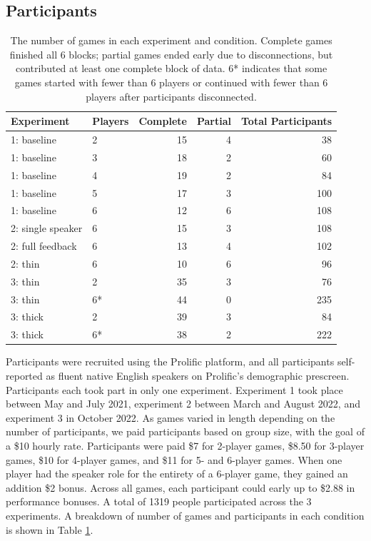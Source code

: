 \documentclass[
  english,
  a4paper,
]{article}
\begin{document}
\hypertarget{participants}{%
\subsection{Participants}\label{participants}}

\begin{table}

\caption{\label{tab:participants}The number of games in each experiment and condition. Complete games finished all 6 blocks; partial games ended early due to disconnections, but contributed at least one complete block of data. 6* indicates that some games started with fewer than 6 players or continued with fewer than 6 players after participants disconnected.}
\centering
\begin{tabular}[t]{l|l|r|r|r}
\hline
Experiment & Players & Complete & Partial & Total Participants\\
\hline
1: baseline & 2 & 15 & 4 & 38\\
\hline
1: baseline & 3 & 18 & 2 & 60\\
\hline
1: baseline & 4 & 19 & 2 & 84\\
\hline
1: baseline & 5 & 17 & 3 & 100\\
\hline
1: baseline & 6 & 12 & 6 & 108\\
\hline
2: single speaker & 6 & 15 & 3 & 108\\
\hline
2: full feedback & 6 & 13 & 4 & 102\\
\hline
2: thin & 6 & 10 & 6 & 96\\
\hline
3: thin & 2 & 35 & 3 & 76\\
\hline
3: thin & 6* & 44 & 0 & 235\\
\hline
3: thick & 2 & 39 & 3 & 84\\
\hline
3: thick & 6* & 38 & 2 & 222\\
\hline
\end{tabular}
\end{table}

Participants were recruited using the Prolific platform, and all participants self-reported as fluent native English speakers on Prolific's demographic prescreen. Participants each took part in only one experiment. Experiment 1 took place between May and July 2021, experiment 2 between March and August 2022, and experiment 3 in October 2022. As games varied in length depending on the number of participants, we paid participants based on group size, with the goal of a \$10 hourly rate. Participants were paid \$7 for 2-player games, \$8.50 for 3-player games, \$10 for 4-player games, and \$11 for 5- and 6-player games. When one player had the speaker role for the entirety of a 6-player game, they gained an addition \$2 bonus. Across all games, each participant could early up to \$2.88 in performance bonuses. A total of 1319 people participated across the 3 experiments. A breakdown of number of games and participants in each condition is shown in Table \ref{tab:participants}.
\end{document}

